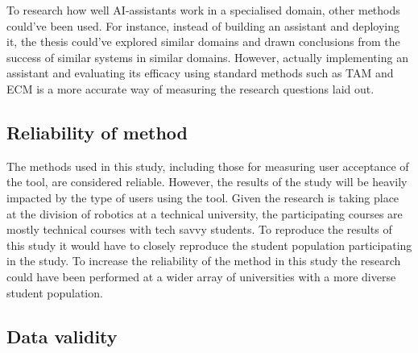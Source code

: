 

To research how well AI-assistants work in a specialised domain, other methods could’ve been used. For instance, instead of building an assistant and deploying it, the thesis could’ve explored similar domains and drawn conclusions from the success of similar systems in similar domains. However, actually implementing an assistant and evaluating its efficacy using standard methods such as \gls{TAM} and \gls{ECM} is a more accurate way of measuring the research questions laid out.


\subsection{Reliability of method}
\label{sec:reliabilityOfMethod}




The methods used in this study, including those for measuring user acceptance of the tool, are considered reliable. However, the results of the study will be heavily impacted by the type of users using the tool. Given the research is taking place at the division of robotics at a technical university, the participating courses are mostly technical courses with tech savvy students. To reproduce the results of this study it would have to closely reproduce the student population participating in the study. To increase the reliability of the method in this study the research could have been performed at a wider array of universities with a more diverse student population.


\subsection{Data validity}
\label{sec:dataValidity}





